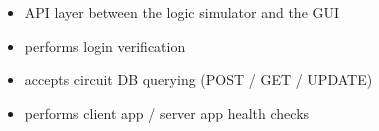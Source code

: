 
\begin{itemize}
\item API layer between the logic simulator and the GUI
\item performs login verification
\item accepts circuit DB querying (POST / GET / UPDATE)
\item performs client app / server app health checks
\end{itemize}

  
